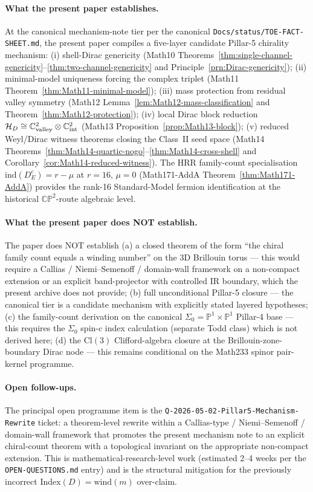 \paragraph{What the present paper establishes.}
At the canonical mechanism-note tier per the canonical
\texttt{Docs/status/TOE-FACT-SHEET.md}, the present paper compiles a
five-layer candidate Pillar-5 chirality mechanism: (i) shell-Dirac
genericity (Math10 Theorems~\ref{thm:single-channel-genericity}--\ref{thm:two-channel-genericity}
and Principle~\ref{prn:Dirac-genericity}); (ii) minimal-model
uniqueness forcing the complex triplet (Math11
Theorem~\ref{thm:Math11-minimal-model}); (iii) mass protection from
residual valley symmetry (Math12
Lemma~\ref{lem:Math12-mass-classification} and
Theorem~\ref{thm:Math12-protection}); (iv) local Dirac block
reduction $\mathcal{H}_D \cong \mathbb{C}^2_{\rm valley} \otimes
\mathbb{C}^2_{\rm int}$ (Math13
Proposition~\ref{prop:Math13-block}); (v) reduced Weyl/Dirac witness
theorems closing the Class~II seed space (Math14
Theorems~\ref{thm:Math14-quartic-nogo}--\ref{thm:Math14-cross-shell}
and Corollary~\ref{cor:Math14-reduced-witness}). The HRR family-count
specialisation $\mathrm{ind}(D_E^c) = r - \mu$ at $r = 16$, $\mu = 0$
(Math171-AddA Theorem~\ref{thm:Math171-AddA}) provides the
rank-16 Standard-Model fermion identification at the historical
$\mathbb{CP}^2$-route algebraic level.

\paragraph{What the present paper does NOT establish.}
The paper does NOT establish (a) a closed theorem of the form
``the chiral family count equals a winding number'' on the 3D
Brillouin torus --- this would require a Callias / Niemi--Semenoff
/ domain-wall framework on a non-compact extension or an explicit
band-projector with controlled IR boundary, which the present
archive does not provide; (b) full unconditional Pillar-5
closure --- the canonical tier is a candidate mechanism with
explicitly stated layered hypotheses; (c) the family-count derivation
on the canonical $\Sigma_0 = \mathbb{P}^1 \times \mathbb{P}^1$
Pillar-4 base --- this requires the $\Sigma_0$ spin-c index calculation
(separate Todd class) which is not derived here; (d) the
$\mathrm{Cl}(3)$ Clifford-algebra closure at the Brillouin-zone-boundary
Dirac node --- this remains conditional on the Math233 spinor
pair-kernel programme.

\paragraph{Open follow-ups.}
The principal open programme item is the
\texttt{Q\hyp{}2026\hyp{}05\hyp{}02\hyp{}Pillar5\hyp{}Mechanism\hyp{}Rewrite}
ticket: a theorem-level rewrite within a Callias-type /
Niemi--Semenoff / domain-wall framework that promotes the present
mechanism note to an explicit chiral-count theorem with a topological
invariant on the appropriate non-compact extension. This is
mathematical-research-level work (estimated 2--4 weeks per the
\texttt{OPEN-QUESTIONS.md} entry) and is the structural mitigation
for the previously incorrect $\mathrm{Index}(D) = \mathrm{wind}(m)$
over-claim.

